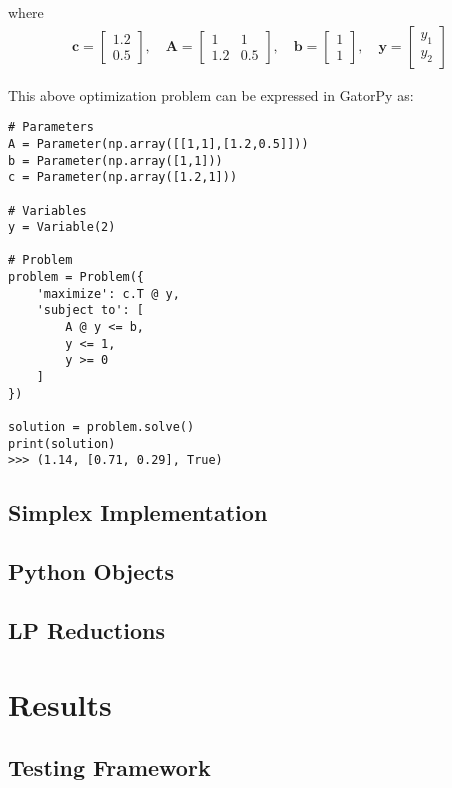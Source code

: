 \documentclass[conference]{IEEEtran}
\begin{document}
where
\begin{align*}
    \textbf{c} = \begin{bmatrix} 1.2 \\ 0.5 \end{bmatrix}, \quad
    \textbf{A} = \begin{bmatrix} 1 & 1 \\ 1.2 & 0.5 \end{bmatrix}, \quad
    \textbf{b} = \begin{bmatrix} 1 \\ 1 \end{bmatrix}, \quad
    \textbf{y} = \begin{bmatrix} y_1 \\ y_2  \end{bmatrix}
\end{align*}

This above optimization problem can be expressed in GatorPy as:
\begin{lstlisting}[style=mypython, caption={Solving a Linear Program Symbolically}]
# Parameters
A = Parameter(np.array([[1,1],[1.2,0.5]]))
b = Parameter(np.array([1,1]))
c = Parameter(np.array([1.2,1]))

# Variables
y = Variable(2)

# Problem
problem = Problem({
    'maximize': c.T @ y,
    'subject to': [
        A @ y <= b,
        y <= 1,
        y >= 0
    ]
})

solution = problem.solve()
print(solution)
>>> (1.14, [0.71, 0.29], True)
\end{lstlisting}

\subsection{Simplex Implementation}
\subsection{Python Objects}

\subsection{LP Reductions}

\section{Results}
\subsection{Testing Framework}
\end{document}
